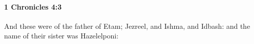 
		\paragraph{1 Chronicles 4:3} %
			\label{1CHRONICLES-4-3}

			And these were of the father of Etam; Jezreel, and Ishma, and Idbash: and the name of their sister was Hazelelponi:


